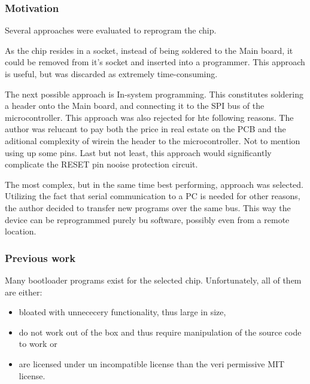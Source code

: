 \subsubsection{Motivation}
Several approaches were evaluated to reprogram the chip.
\par
As the chip resides in a socket, instead of being soldered to the Main board, it could be removed from it's socket and inserted into a programmer.
This approach is useful, but was discarded as extremely time-consuming.
\par
The next possible approach is In-system programming.
This constitutes soldering a header onto the Main board, and connecting it to the SPI bus of the microcontroller.
This approach was also rejected for hte following reasons.
The author was relucant to pay both the price in real estate on the PCB and the aditional complexity of wirein the header to the microcontroller.
Not to mention using up some pins.
Last but not least, this approach would significantly complicate the RESET pin nooise protection circuit.
\par
The most complex, but in the same time best performing, approach was selected.
Utilizing the fact that serial communication to a PC is needed for other reasons, the author decided to transfer new programs over the same bus.
This way the device can be reprogrammed purely bu software, possibly even from a remote location.

\subsubsection{Previous work}
Many bootloader programs exist for the selected chip.
Unfortunately, all of them are either:
\begin{itemize}
\item{bloated with unnececery functionality, thus large in size,}
\item{do not work out of the box and thus require manipulation of the source code to work or}
\item{are licensed under un incompatible license than the veri permissive MIT license.}
\end{itemize}

